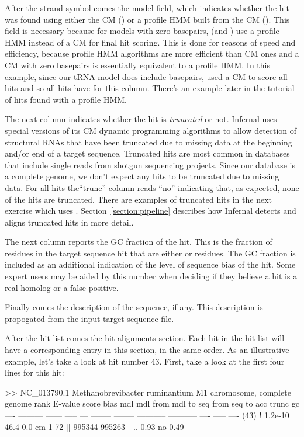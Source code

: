 After the strand symbol comes the model field, which indicates whether
the hit was found using either the CM () or a profile HMM
built from the CM (). This field is necessary because for
models with zero basepairs,  (and ) use a
profile HMM instead of a CM for final hit scoring. This is done for
reasons of speed and efficiency, because profile HMM algorithms are
more efficient than CM ones and a CM with zero basepairs is
essentially equivalent to a profile HMM. In this example, since our
tRNA model does include basepairs,  used a CM to score
all hits and so all hits have  for this column. There's an
example later in the tutorial of hits found with a profile HMM.

The next column indicates whether the hit is \emph{truncated} or
not. Infernal uses special versions of its CM dynamic programming
algorithms to allow detection of structural RNAs that have been
truncated due to missing data at the beginning and/or end of a target
sequence. Truncated hits are most common in databases that include
single reads from shotgun sequencing projects. Since our database is a
complete genome, we don't expect any hits to be truncated due to
missing data. For all hits the``trunc'' column reads
``no'' indicating that, as expected, none of the hits are
truncated. There are examples of truncated hits in the next exercise
which uses . Section~\ref{section:pipeline} describes how
Infernal detects and aligns truncated hits in more detail.

The next column reports the GC fraction of the hit. This is the
fraction of residues in the target sequence hit that are either
 or  residues. The GC fraction is included as an
additional indication of the level of sequence bias of the hit. Some
expert users may be aided by this number when deciding if they 
believe a hit is a real homolog or a false positive.

Finally comes the description of the sequence, if any. This
description is propogated from the input target sequence file.

After the hit list comes the hit alignments section. Each hit in 
the hit list will have a corresponding entry in this section, in the
same order. As an illustrative example, let's take a look at
hit number 43. First, take a look at the first four lines for this
hit: 

\begin{sreoutput}
>> NC_013790.1  Methanobrevibacter ruminantium M1 chromosome, complete genome
 rank     E-value  score  bias mdl mdl from   mdl to       seq from      seq to       acc trunc   gc
 ----   --------- ------ ----- --- -------- --------    ----------- -----------      ---- ----- ----
 (43) !   1.2e-10   46.4   0.0  cm        1       72 []      995344      995263 - .. 0.93    no 0.49
\end{sreoutput}

